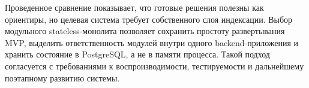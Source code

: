 Проведенное сравнение показывает, что готовые решения полезны как ориентиры,
но целевая система требует собственного слоя индексации. Выбор модульного
stateless-монолита позволяет сохранить простоту развертывания MVP, выделить
ответственность модулей внутри одного backend-приложения и хранить состояние в
PostgreSQL, а не в памяти процесса. Такой подход согласуется с требованиями к
воспроизводимости, тестируемости и дальнейшему поэтапному развитию системы.
